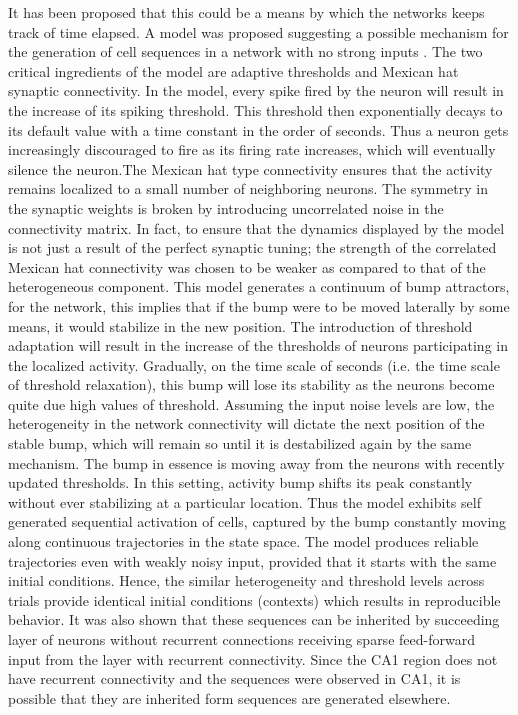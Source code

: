 It has been proposed that this could be a means by which the networks keeps track of time elapsed. A model was proposed suggesting a possible mechanism for the generation of cell sequences in a network with no strong inputs \cite{Itskov2011a}. The two critical ingredients of the model are adaptive thresholds and Mexican hat synaptic connectivity. In the model, every spike fired by the neuron will result in the increase of its spiking threshold. This threshold then exponentially decays to its default value with a time constant in the order of seconds. Thus a neuron gets increasingly discouraged to fire as its firing rate increases, which will eventually silence the neuron.The Mexican hat type connectivity ensures that the activity remains localized to a small number of neighboring neurons. The symmetry in the synaptic weights is broken by introducing uncorrelated noise in the connectivity matrix. In fact, to ensure that the dynamics displayed by the model is not just a result of the perfect synaptic tuning; the strength of the correlated Mexican hat connectivity was chosen to be weaker as compared to that of the heterogeneous component. This model generates a continuum of bump attractors, for the network, this implies that if the bump were to be moved laterally by some means, it would stabilize in the new position.  The introduction of threshold adaptation will result in the increase of the thresholds of neurons participating in the localized activity. Gradually, on the time scale of seconds (i.e. the time scale of threshold relaxation), this bump will lose its stability as the neurons become quite due high values of threshold. Assuming the input noise levels are low, the heterogeneity in the network connectivity will dictate the next position of the stable bump, which will remain so until it is destabilized again by the same mechanism. The bump in essence is moving away from the neurons with recently updated thresholds. In this setting, activity bump shifts its peak constantly without ever stabilizing at a particular location. Thus the model exhibits self generated sequential activation of cells, captured by the bump constantly moving along continuous trajectories in the state space. The model produces reliable trajectories even with weakly noisy input, provided that it starts with the same initial conditions. Hence, the similar heterogeneity and threshold levels across trials provide identical initial conditions (contexts) which results in reproducible behavior. It was also shown that these sequences can be inherited by succeeding layer of neurons without recurrent connections receiving sparse feed-forward input from the layer with recurrent connectivity. Since the CA1 region does not have recurrent connectivity and the sequences were observed in CA1, it is possible that they are inherited form sequences are generated elsewhere.


